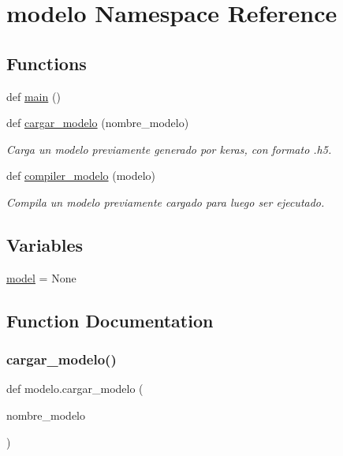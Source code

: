 \hypertarget{namespacemodelo}{}\section{modelo Namespace Reference}
\label{namespacemodelo}
\subsection*{Functions}
\begin{DoxyCompactItemize}
\item 
def \mbox{\hyperlink{namespacemodelo_acfb71b224c35db75485511e5a7b1ac7d}{main}} ()
\item 
def \mbox{\hyperlink{namespacemodelo_a1003684c17149ab9b5f89f9e77b687a7}{cargar\+\_\+modelo}} (nombre\+\_\+modelo)
\begin{DoxyCompactList}\small\item\em Carga un modelo previamente generado por keras, con formato .h5. \end{DoxyCompactList}\item 
def \mbox{\hyperlink{namespacemodelo_a4a48c138f410a4c8a4021e2696b7d5c6}{compiler\+\_\+modelo}} (modelo)
\begin{DoxyCompactList}\small\item\em Compila un modelo previamente cargado para luego ser ejecutado. \end{DoxyCompactList}\end{DoxyCompactItemize}
\subsection*{Variables}
\begin{DoxyCompactItemize}
\item 
\mbox{\hyperlink{namespacemodelo_abf25581a59085c7c54c1ae4f8bc9eb5e}{model}} = None
\end{DoxyCompactItemize}


\subsection{Function Documentation}
\mbox{\label{namespacemodelo_a1003684c17149ab9b5f89f9e77b687a7}} 
\subsubsection{\texorpdfstring{cargar\+\_\+modelo()}{cargar\_modelo()}}
{\footnotesize\ttfamily def modelo.\+cargar\+\_\+modelo (\begin{DoxyParamCaption}\item[{}]{nombre\+\_\+modelo }\end{DoxyParamCaption})}



